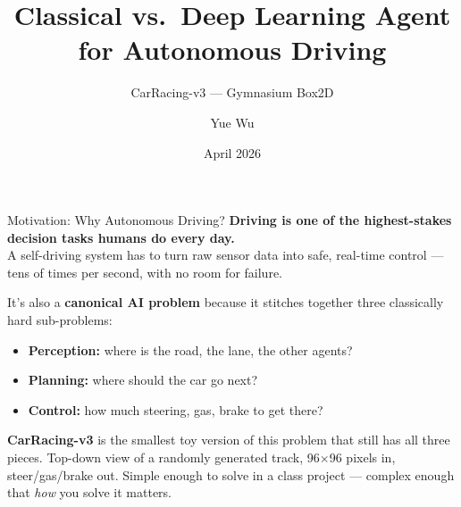 \documentclass[aspectratio=169, 12pt]{beamer}
\title{\textbf{Classical vs.\ Deep Learning Agent}\\for Autonomous Driving}
\subtitle{CarRacing-v3 --- Gymnasium Box2D}
\author{Yue Wu}
\date{April 2026}
\begin{document}
\begin{frame}
\titlepage
\end{frame}

\begin{frame}{Motivation: Why Autonomous Driving?}
\textbf{Driving is one of the highest-stakes decision tasks humans do every day.}\\[0.3em]
A self-driving system has to turn raw sensor data into safe, real-time control --- tens of times per second, with no room for failure.

\vspace{0.6em}
It's also a \textbf{canonical AI problem} because it stitches together three classically hard sub-problems:
\begin{itemize}\setlength\itemsep{0.2em}
    \item \textbf{Perception:} where is the road, the lane, the other agents?
    \item \textbf{Planning:} where should the car go next?
    \item \textbf{Control:} how much steering, gas, brake to get there?
\end{itemize}

\vspace{0.6em}
\textbf{CarRacing-v3} is the smallest toy version of this problem that still has all three pieces. Top-down view of a randomly generated track, 96$\times$96 pixels in, steer/gas/brake out. Simple enough to solve in a class project --- complex enough that \textit{how} you solve it matters.
\end{frame}
\end{document}
